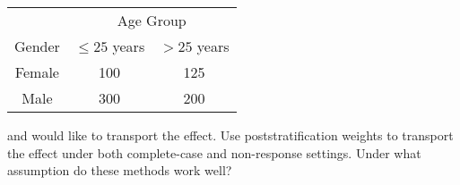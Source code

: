 \documentclass[12pt]{article}
\begin{document}
\begin{enumerate}
\begin{itemize}
	\begin{table}[!th]
\centering
\begin{tabular}{c c c}
& \multicolumn{2}{c}{Age Group} \\ \cline{2-3}
Gender & $\leq 25$ years & $> 25$ years \\ \hline
Female & 100 & 125 \\
Male & 300 & 200 \\ \hline
\end{tabular}
\end{table}
and would like to transport the effect.  Use poststratification weights to transport the effect under both complete-case and non-response settings.  Under what assumption do these methods work well?
\end{itemize}
\newpage

\end{enumerate}
\end{document}
